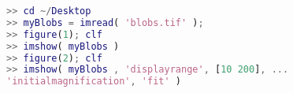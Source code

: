 \begin{lstlisting}[language=matlab]
>> cd ~/Desktop
>> myBlobs = imread( 'blobs.tif' );
>> figure(1); clf
>> imshow( myBlobs )
>> figure(2); clf
>> imshow( myBlobs , 'displayrange', [10 200], ...
'initialmagnification', 'fit' )

\end{lstlisting}